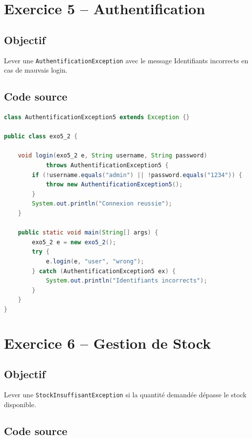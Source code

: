\section{Exercice 5 -- Authentification}

\subsection{Objectif}

Lever une \texttt{AuthentificationException} avec le message
\og Identifiants incorrects \fg{} en cas de mauvais login.

\subsection{Code source}

\begin{lstlisting}[language=Java, caption={exo5\_2.java -- AuthentificationException}]
class AuthentificationException5 extends Exception {}

public class exo5_2 {

    void login(exo5_2 e, String username, String password)
            throws AuthentificationException5 {
        if (!username.equals("admin") || !password.equals("1234")) {
            throw new AuthentificationException5();
        }
        System.out.println("Connexion reussie");
    }

    public static void main(String[] args) {
        exo5_2 e = new exo5_2();
        try {
            e.login(e, "user", "wrong");
        } catch (AuthentificationException5 ex) {
            System.out.println("Identifiants incorrects");
        }
    }
}
\end{lstlisting}

\section{Exercice 6 -- Gestion de Stock}

\subsection{Objectif}

Lever une \texttt{StockInsuffisantException} si la quantité demandée dépasse le stock disponible.

\subsection{Code source}

